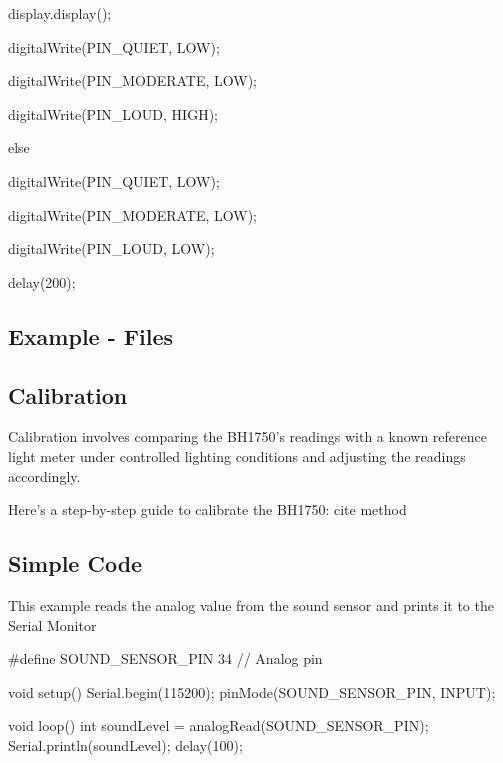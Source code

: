 \begin{Arduino}
{{			display.display();
			
			digitalWrite(PIN_QUIET, LOW);
			
			digitalWrite(PIN_MODERATE, LOW);
			
			digitalWrite(PIN_LOUD, HIGH);
			
		}
		
		else
		
		{
			
			digitalWrite(PIN_QUIET, LOW);
			
			digitalWrite(PIN_MODERATE, LOW);
			
			digitalWrite(PIN_LOUD, LOW);
			
		}
		
		
		
		delay(200);
		
	}
	
	
\end{Arduino}



\subsection{Example - Files}



\subsection{Calibration}

Calibration involves comparing the BH1750's readings with a known reference light meter under controlled lighting conditions and adjusting the readings accordingly.

Here’s a step-by-step guide to calibrate the BH1750:
cite method

\subsection{Simple Code}
This example reads the analog value from the sound sensor and prints it to the Serial Monitor

\begin{Arduino}
	#define SOUND_SENSOR_PIN 34  // Analog pin
	
	void setup() {
		Serial.begin(115200);
		pinMode(SOUND_SENSOR_PIN, INPUT);
	}
	
	void loop() {
		int soundLevel = analogRead(SOUND_SENSOR_PIN);
		Serial.println(soundLevel);
		delay(100);
	}
	
	
\end{Arduino}

